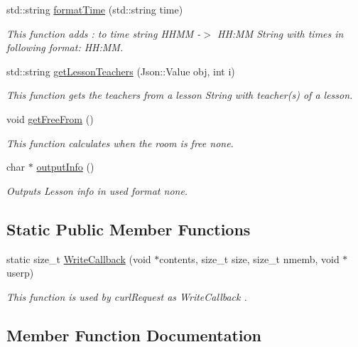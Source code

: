 \begin{DoxyCompactItemize}
std\+::string \hyperlink{classCurlHandler_a8552fd1c4558661d3699e4cbd8897acc}{format\+Time} (std\+::string time)
\begin{DoxyCompactList}\small\item\em This function adds \+: to time string H\+H\+MM -\/$>$ HH\+:MM  String with times in following format\+: HH\+:MM. \end{DoxyCompactList}\item 
std\+::string \hyperlink{classCurlHandler_acd45a047ecf8bad0977f8e890914a59a}{get\+Lesson\+Teachers} (Json\+::\+Value obj, int i)
\begin{DoxyCompactList}\small\item\em This function gets the teachers from a lesson  String with teacher(s) of a lesson. \end{DoxyCompactList}\item 
void \hyperlink{classCurlHandler_a43b8d7b4ec2866c34820baa71236a15a}{get\+Free\+From} ()
\begin{DoxyCompactList}\small\item\em This function calculates when the room is free  none. \end{DoxyCompactList}\item 
char $\ast$ \hyperlink{classCurlHandler_a5d840e40c7e2d11297514947e957d542}{output\+Info} ()
\begin{DoxyCompactList}\small\item\em Outputs Lesson info in used format  none. \end{DoxyCompactList}\end{DoxyCompactItemize}
\subsection*{Static Public Member Functions}
\begin{DoxyCompactItemize}
\item 
static size\+\_\+t \hyperlink{classCurlHandler_aff816fc825c4ad52b377c808a900d07d}{Write\+Callback} (void $\ast$contents, size\+\_\+t size, size\+\_\+t nmemb, void $\ast$userp)
\begin{DoxyCompactList}\small\item\em This function is used by curl\+Request as Write\+Callback . \end{DoxyCompactList}\end{DoxyCompactItemize}


\subsection{Member Function Documentation}
\mbox{\label{classCurlHandler_a3b115e8ef11a96743b49797b4025b3a0}} 
